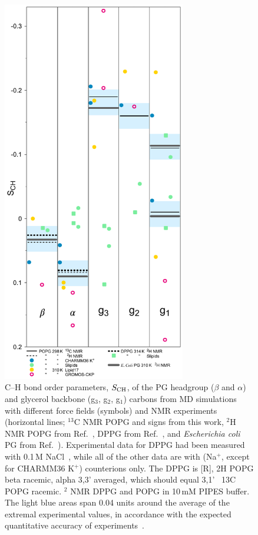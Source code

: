 \documentclass[journal=jpcbfk]{achemso}
\begin{document}
\begin{figure}[!h]
  \centering
  \includegraphics[width=8.0cm]{./Figs/HGorderparametersPG.pdf}
  \caption{\label{HGorderParametersPOPG}
    C--H bond order parameters, $S_{\rm CH}$, of the PG headgroup ($\beta$ and $\alpha$) and
    glycerol backbone (g$_3$, g$_2$, g$_1$) carbons
    from MD simulations with different force fields (symbols) and
    NMR experiments (horizontal lines;
    $^{13}$C NMR POPG and signs from this work,
    $^2$H NMR POPG from Ref.~, %
    DPPG from Ref.~, %
    and {\it Escherichia coli} PG from Ref.~).
    Experimental data for DPPG had been measured with 0.1\,M NaCl~\cite{wohlgemuth80}, while all of the other data are with
    (Na$^+$, except for CHARMM36 K$^+$) counterions only.
    The DPPG is [R],
    2H POPG beta racemic, alpha 3,3' averaged, which should equal 3,1'~\cite{wohlgemuth80}
    13C POPG racemic.
    $^2$ NMR DPPG and POPG in 10\,mM PIPES buffer.
    The light blue areas span 0.04 units around the average of the extremal experimental values,
    in accordance with the expected quantitative accuracy of experiments~\cite{ollila16}.
  }
\end{figure}
\end{document}
